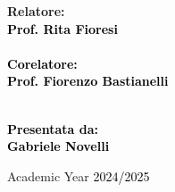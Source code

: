 \documentclass[12pt,a4paper]{report}
\theoremstyle{definition}
\theoremstyle{Theorem}
\theoremstyle{definition}
\theoremstyle{definition}
\begin{document}
\begin{frontespizio}
\begin{titlepage}
			\begin{minipage}[t]{0.47\textwidth}
				{\large{\bf Relatore: \vspace{2mm}\\\textcolor{black}{
							Prof. Rita Fioresi}\\\\
						\textcolor{black}{
							\bf Corelatore: 
							\vspace{2mm}\\
							Prof. Fiorenzo Bastianelli\\\\}}
				}
			\end{minipage}
			\hfill
			\begin{minipage}[t]{0.47\textwidth}\raggedleft \textcolor{black}{
					{\large{\bf Presentata da:
							\vspace{2mm}\\
							Gabriele Novelli}}}
			\end{minipage}
			
			\vspace{40mm}
			
			\begin{center}
				Academic Year \textcolor{black}{ 2024/2025}
			\end{center}
			
		\end{titlepage}
	\end{frontespizio}
	\thispagestyle{empty}
	\mbox{}
	\newpage
\end{document}
